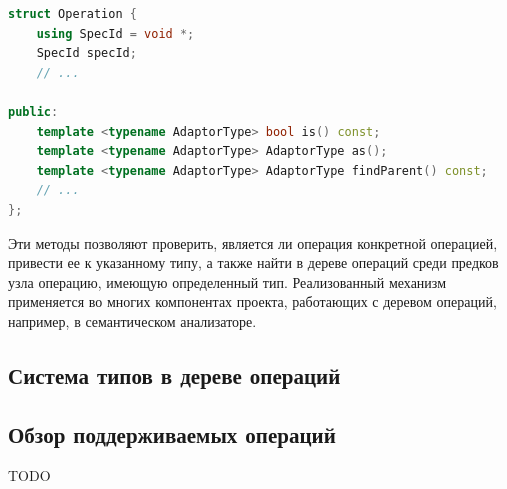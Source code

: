 \begin{lstlisting}[language=C++, caption=Интерфейс для доступа к RTTI]
struct Operation {
    using SpecId = void *;
    SpecId specId;
    // ...

public:
    template <typename AdaptorType> bool is() const;
    template <typename AdaptorType> AdaptorType as();
    template <typename AdaptorType> AdaptorType findParent() const;
    // ...
};
\end{lstlisting}

Эти методы позволяют проверить, является ли операция конкретной операцией, привести ее к указанному типу, а также найти в дереве операций среди предков узла операцию, имеющую определенный тип. Реализованный механизм применяется во многих компонентах проекта, работающих с деревом операций, например, в семантическом анализаторе.

\subsection{Система типов в дереве операций}
\label{sec:optree_types}

\subsection{Обзор поддерживаемых операций}
\label{sec:optree_operations}

TODO
